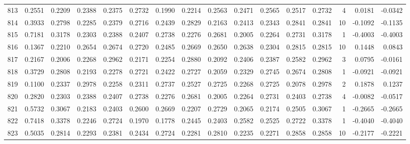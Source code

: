 \begin{tabular}{lrrrrrrrrrrrrrrr}
813 &      0.2551 &  0.2209 &  0.2388 &  0.2375 &  0.2732 &  0.1990 &  0.2214 &  0.2563 &  0.2471 &  0.2565 &   0.2517 &     0.2732 &      4 &                    0.0181 &                    -0.0342 \\
814 &      0.3933 &  0.2798 &  0.2285 &  0.2379 &  0.2716 &  0.2439 &  0.2829 &  0.2163 &  0.2413 &  0.2343 &   0.2841 &     0.2841 &     10 &                   -0.1092 &                    -0.1135 \\
815 &      0.7181 &  0.3178 &  0.2303 &  0.2388 &  0.2407 &  0.2738 &  0.2276 &  0.2681 &  0.2005 &  0.2264 &   0.2731 &     0.3178 &      1 &                   -0.4003 &                    -0.4003 \\
816 &      0.1367 &  0.2210 &  0.2654 &  0.2674 &  0.2720 &  0.2485 &  0.2669 &  0.2650 &  0.2638 &  0.2304 &   0.2815 &     0.2815 &     10 &                    0.1448 &                     0.0843 \\
817 &      0.2167 &  0.2006 &  0.2268 &  0.2962 &  0.2171 &  0.2254 &  0.2880 &  0.2092 &  0.2406 &  0.2387 &   0.2582 &     0.2962 &      3 &                    0.0795 &                    -0.0161 \\
818 &      0.3729 &  0.2808 &  0.2193 &  0.2278 &  0.2721 &  0.2422 &  0.2727 &  0.2059 &  0.2329 &  0.2745 &   0.2674 &     0.2808 &      1 &                   -0.0921 &                    -0.0921 \\
819 &      0.1100 &  0.2337 &  0.2978 &  0.2258 &  0.2311 &  0.2737 &  0.2527 &  0.2725 &  0.2268 &  0.2725 &   0.2078 &     0.2978 &      2 &                    0.1878 &                     0.1237 \\
820 &      0.2820 &  0.2303 &  0.2388 &  0.2407 &  0.2738 &  0.2276 &  0.2681 &  0.2005 &  0.2264 &  0.2731 &   0.2403 &     0.2738 &      4 &                   -0.0082 &                    -0.0517 \\
821 &      0.5732 &  0.3067 &  0.2183 &  0.2403 &  0.2600 &  0.2669 &  0.2207 &  0.2729 &  0.2065 &  0.2174 &   0.2505 &     0.3067 &      1 &                   -0.2665 &                    -0.2665 \\
822 &      0.7418 &  0.3378 &  0.2246 &  0.2724 &  0.1970 &  0.1778 &  0.2445 &  0.2403 &  0.2582 &  0.2525 &   0.2722 &     0.3378 &      1 &                   -0.4040 &                    -0.4040 \\
823 &      0.5035 &  0.2814 &  0.2293 &  0.2381 &  0.2434 &  0.2724 &  0.2281 &  0.2810 &  0.2235 &  0.2271 &   0.2858 &     0.2858 &     10 &                   -0.2177 &                    -0.2221 \\

\end{tabular}

